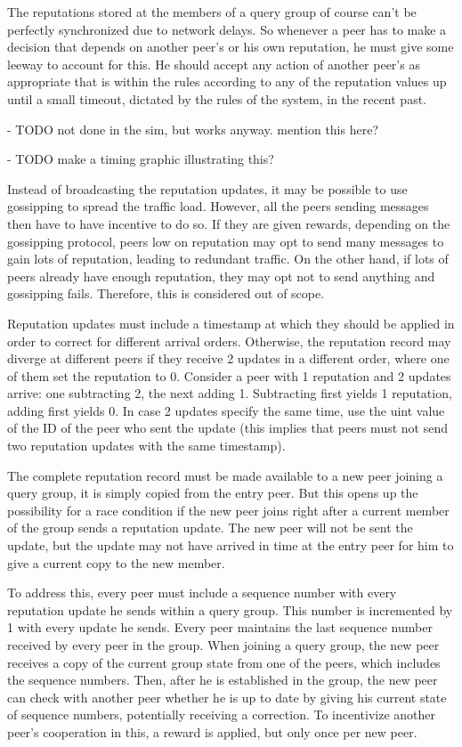 The reputations stored at the members of a query group of course can't be
perfectly synchronized due to network delays. So whenever a peer has to make a
decision that depends on another peer's or his own reputation, he must give some
leeway to account for this. He should accept any action of another peer's as
appropriate that is within the rules according to any of the reputation values
up until a small timeout, dictated by the rules of the system, in the recent
past.

- TODO not done in the sim, but works anyway. mention this here?

- TODO make a timing graphic illustrating this?

Instead of broadcasting the reputation updates, it may be possible to use
gossipping to spread the traffic load. However, all the peers sending messages
then have to have incentive to do so. If they are given rewards, depending on
the gossipping protocol, peers low on reputation may opt to send many messages
to gain lots of reputation, leading to redundant traffic. On the other hand, if
lots of peers already have enough reputation, they may opt not to send anything
and gossipping fails. Therefore, this is considered out of scope.

Reputation updates must include a timestamp at which they should be applied in
order to correct for different arrival orders. Otherwise, the reputation record
may diverge at different peers if they receive 2 updates in a different order,
where one of them set the reputation to 0. Consider a peer with 1 reputation and
2 updates arrive: one subtracting 2, the next adding 1. Subtracting first yields
1 reputation, adding first yields 0. In case 2 updates specify the same time,
use the uint value of the ID of the peer who sent the update (this implies that
peers must not send two reputation updates with the same timestamp).

The complete reputation record must be made available to a new peer joining a
query group, it is simply copied from the entry peer. But this opens up the
possibility for a race condition if the new peer joins right after a current
member of the group sends a reputation update. The new peer will not be sent the
update, but the update may not have arrived in time at the entry peer for him to
give a current copy to the new member.

To address this, every peer must include a sequence number with every reputation
update he sends within a query group. This number is incremented by 1 with every
update he sends. Every peer maintains the last sequence number received by every
peer in the group. When joining a query group, the new peer receives a copy of
the current group state from one of the peers, which includes the sequence
numbers. Then, after he is established in the group, the new peer can check with
another peer whether he is up to date by giving his current state of sequence
numbers, potentially receiving a correction. To incentivize another peer's
cooperation in this, a reward is applied, but only once per new peer.


